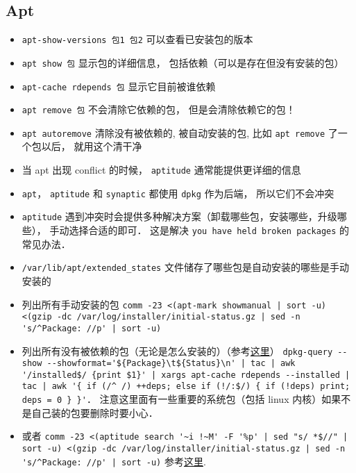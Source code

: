 
\begin{issues}
\issueDraft
\end{issues}

\subsection{Apt}
\begin{itemize}
\item \verb|apt-show-versions 包1 包2| 可以查看已安装包的版本
\item \verb|apt show 包| 显示包的详细信息， 包括依赖（可以是存在但没有安装的包）
\item \verb|apt-cache rdepends 包| 显示它目前被谁依赖
\item \verb|apt remove 包| 不会清除它依赖的包， 但是会清除依赖它的包！
\item \verb|apt autoremove| 清除没有被依赖的, 被自动安装的包, 比如 \verb|apt remove| 了一个包以后， 就用这个清干净
\item 当 apt 出现 conflict 的时候， \verb|aptitude| 通常能提供更详细的信息
\item \verb|apt|， \verb|aptitude| 和 \verb|synaptic| 都使用 \verb|dpkg| 作为后端， 所以它们不会冲突
\item \verb|aptitude| 遇到冲突时会提供多种解决方案（卸载哪些包，安装哪些，升级哪些）， 手动选择合适的即可． 这是解决 \verb|you have held broken packages| 的常见办法．
\item \verb|/var/lib/apt/extended_states| 文件储存了哪些包是自动安装的哪些是手动安装的
\item 列出所有手动安装的包 \verb`comm -23 <(apt-mark showmanual | sort -u) <(gzip -dc /var/log/installer/initial-status.gz | sed -n 's/^Package: //p' | sort -u)`
\item 列出所有没有被依赖的包（无论是怎么安装的）（参考\href{https://askubuntu.com/questions/1114733/how-do-i-list-all-packages-that-no-package-depends-on}{这里}） \verb`dpkg-query --show --showformat='${Package}\t${Status}\n' | tac | awk '/installed$/ {print $1}' | xargs apt-cache rdepends --installed | tac | awk '{ if (/^ /) ++deps; else if (!/:$/) { if (!deps) print; deps = 0 } }'`． 注意这里面有一些重要的系统包（包括 linux 内核）如果不是自己装的包要删除时要小心．
\item 或者 \verb`comm -23 <(aptitude search '~i !~M' -F '%p' | sed "s/ *$//" | sort -u) <(gzip -dc /var/log/installer/initial-status.gz | sed -n 's/^Package: //p' | sort -u)` 参考\href{https://askubuntu.com/questions/2389/how-to-list-manually-installed-packages}{这里}.

\end{itemize}
